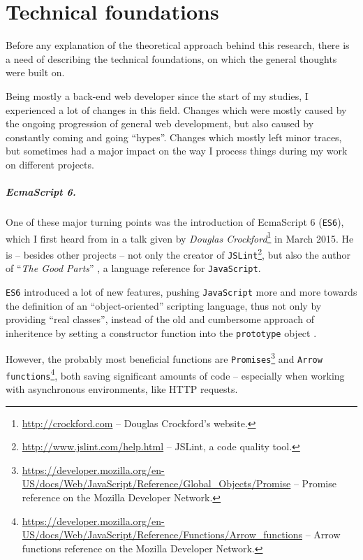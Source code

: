 \chapter{Technical foundations}
\label{cha:technicalfoundations}

Before any explanation of the theoretical approach behind this research, there is a need of describing the technical foundations, on which the general thoughts were built on.

Being mostly a back-end web developer since the start of my studies, I experienced a lot of changes in this field. Changes which were mostly caused by the ongoing progression of general web development, but also caused by constantly coming and going ``hypes''. Changes which mostly left minor traces, but sometimes had a major impact on the way I process things during my work on different projects.

\paragraph{EcmaScript 6.}
One of these major turning points was the introduction of EcmaScript 6 (\texttt{ES6}), which I first heard from in a talk given by \emph{Douglas Crockford}\footnote{\url{http://crockford.com} -- Douglas Crockford's website.} in March 2015. He is -- besides other projects -- not only the creator of \texttt{JSLint}\footnote{\url{http://www.jslint.com/help.html} -- JSLint, a code quality tool.}, but also the author of ``\emph{The Good Parts}'' \cite{crockford2008javascript}, a language reference for \texttt{JavaScript}.

\texttt{ES6} introduced a lot of new features, pushing \texttt{JavaScript} more and more towards the definition of an ``object-oriented'' scripting language, thus not only by providing ``real classes'', instead of the old and cumbersome approach of inheritence by setting a constructor function into the \texttt{prototype} object \cite[47]{crockford2008javascript}.

However, the probably most beneficial functions are \texttt{Promises}\footnote{\url{https://developer.mozilla.org/en-US/docs/Web/JavaScript/Reference/Global_Objects/Promise} -- Promise reference on the Mozilla Developer Network.} and \texttt{Arrow functions}\footnote{\url{https://developer.mozilla.org/en-US/docs/Web/JavaScript/Reference/Functions/Arrow_functions} -- Arrow functions reference on the Mozilla Developer Network.}, both saving significant amounts of code -- especially when working with asynchronous environments, like HTTP requests.

